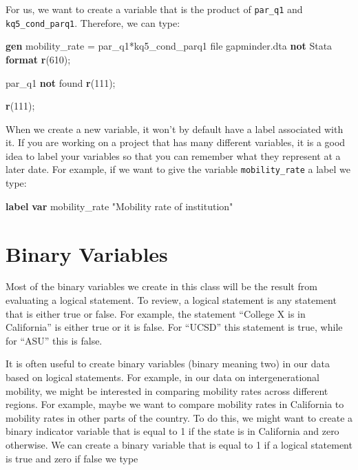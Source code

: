 \documentclass[
]{book}
\newenvironment{Shaded}{\begin{snugshade}}{\end{snugshade}}
\newcommand{\FunctionTok}[1]{\textcolor[rgb]{0.13,0.29,0.53}{\textbf{#1}}}
\newcommand{\KeywordTok}[1]{\textcolor[rgb]{0.13,0.29,0.53}{\textbf{#1}}}
\newcommand{\NormalTok}[1]{#1}
\newcommand{\StringTok}[1]{\textcolor[rgb]{0.31,0.60,0.02}{#1}}
\begin{document}
For us, we want to create a variable that is the product of \texttt{par\_q1} and \texttt{kq5\_cond\_parq1}. Therefore, we can type:

\begin{Shaded}
\begin{Highlighting}[]
\KeywordTok{gen}\NormalTok{ mobility\_rate = par\_q1*kq5\_cond\_parq1}
\NormalTok{file gapminder.dta }\KeywordTok{not}\NormalTok{ Stata }\KeywordTok{format}
\FunctionTok{r}\NormalTok{(610);}


\NormalTok{par\_q1 }\KeywordTok{not}\NormalTok{ found}
\FunctionTok{r}\NormalTok{(111);}

\FunctionTok{r}\NormalTok{(111);}
\end{Highlighting}
\end{Shaded}

When we create a new variable, it won't by default have a label associated with it. If you are working on a project that has many different variables, it is a good idea to label your variables so that you can remember what they represent at a later date. For example, if we want to give the variable \texttt{mobility\_rate} a label we type:

\begin{Shaded}
\begin{Highlighting}[]
\KeywordTok{label} \KeywordTok{var}\NormalTok{ mobility\_rate }\StringTok{"Mobility rate of institution"}
\end{Highlighting}
\end{Shaded}

\section{Binary Variables}\label{binary-variables}

Most of the binary variables we create in this class will be the result from evaluating a logical statement. To review, a logical statement is any statement that is either true or false. For example, the statement ``College X is in California'' is either true or it is false. For ``UCSD'' this statement is true, while for ``ASU'' this is false.

It is often useful to create binary variables (binary meaning two) in our data based on logical statements. For example, in our data on intergenerational mobility, we might be interested in comparing mobility rates across different regions. For example, maybe we want to compare mobility rates in California to mobility rates in other parts of the country. To do this, we might want to create a binary indicator variable that is equal to 1 if the state is in California and zero otherwise. We can create a binary variable that is equal to 1 if a logical statement is true and zero if false we type
\end{document}
